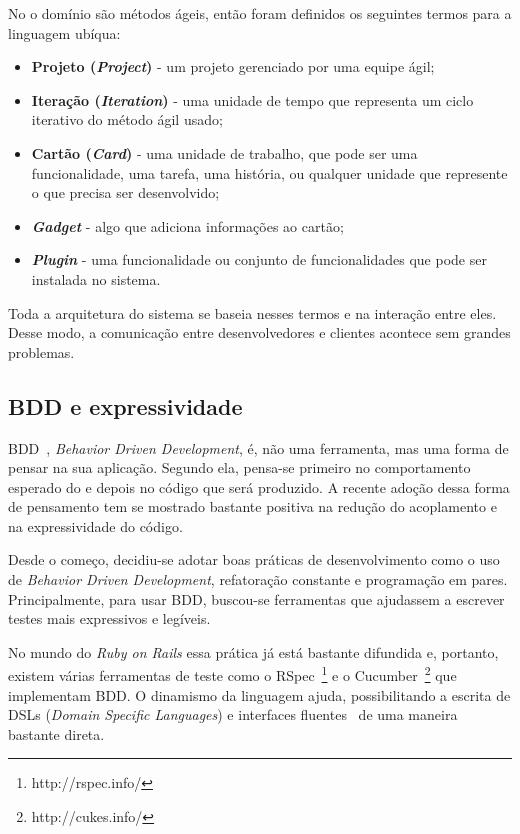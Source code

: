 No \calopsita{} o domínio são métodos ágeis, então foram definidos os seguintes termos para a linguagem ubíqua:

\begin{itemize}
	\item{\textbf{Projeto (\textit{Project})} - um projeto gerenciado por uma equipe ágil;}
	\item{\textbf{Iteração (\textit{Iteration})} - uma unidade de tempo que representa um ciclo iterativo do método ágil usado;}
	\item{\textbf{Cartão (\textit{Card})} - uma unidade de trabalho, que pode ser uma funcionalidade, uma tarefa, uma história, ou qualquer unidade que represente o que precisa ser desenvolvido;}
	\item{\textbf{\textit{Gadget}} - algo que adiciona informações ao cartão;}
	\item{\textbf{\textit{Plugin}} - uma funcionalidade ou conjunto de funcionalidades que pode ser instalada no sistema.}
\end{itemize}

Toda a arquitetura do sistema se baseia nesses termos e na interação entre eles. Desse modo, a comunicação entre desenvolvedores e clientes acontece sem grandes problemas.

\subsection{BDD e expressividade} 
\label{bdd}

BDD~\cite{bdd}, \textit{Behavior Driven Development}, é, não uma ferramenta, mas uma forma de pensar na sua aplicação. Segundo ela, pensa-se primeiro no comportamento esperado do \software{} e depois no código que será produzido. A recente adoção dessa forma de pensamento tem se mostrado bastante positiva na redução do acoplamento e na expressividade do código.

Desde o começo, decidiu-se adotar boas práticas de desenvolvimento como o uso de \textit{Behavior Driven Development}, refatoração constante e programação em pares. Principalmente, para usar BDD, buscou-se ferramentas que ajudassem a escrever testes mais expressivos e legíveis. 

No mundo do \textit{Ruby on Rails} essa prática já está bastante difundida e, portanto, existem várias ferramentas de teste como o RSpec~\footnote{http://rspec.info/} e o Cucumber~\footnote{http://cukes.info/} que implementam BDD. O dinamismo da linguagem ajuda, possibilitando a escrita de DSLs (\textit{Domain Specific Languages}) e interfaces fluentes~\cite{dsl} de uma maneira bastante direta. 

